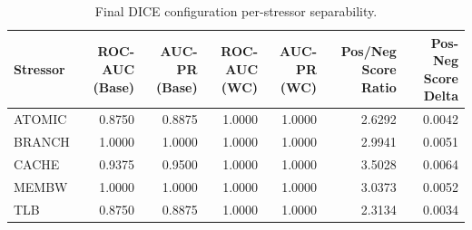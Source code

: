 \begin{table}[t]
\centering
\caption{Final DICE configuration per-stressor separability.}
\label{tab:dice_full_stressor}
\footnotesize
\begin{tabular}{lrrrrrr}
\toprule
Stressor & ROC-AUC (Base) & AUC-PR (Base) & ROC-AUC (WC) & AUC-PR (WC) & Pos/Neg Score Ratio & Pos-Neg Score Delta \\
\midrule
ATOMIC & 0.8750 & 0.8875 & 1.0000 & 1.0000 & 2.6292 & 0.0042 \\
BRANCH & 1.0000 & 1.0000 & 1.0000 & 1.0000 & 2.9941 & 0.0051 \\
CACHE & 0.9375 & 0.9500 & 1.0000 & 1.0000 & 3.5028 & 0.0064 \\
MEMBW & 1.0000 & 1.0000 & 1.0000 & 1.0000 & 3.0373 & 0.0052 \\
TLB & 0.8750 & 0.8875 & 1.0000 & 1.0000 & 2.3134 & 0.0034 \\
\bottomrule
\end{tabular}

\end{table}

